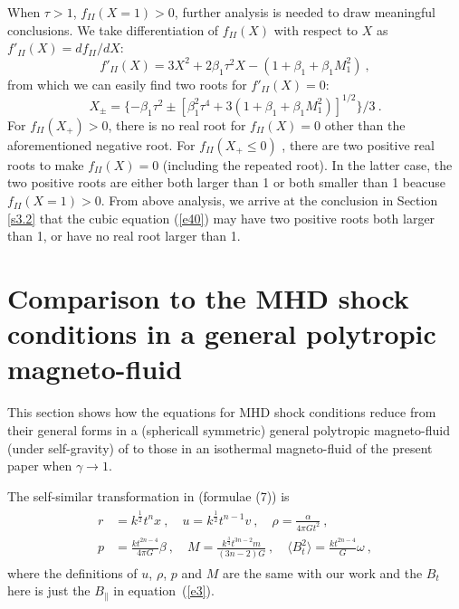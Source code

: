 \documentclass[fleqn,usenatbib]{mnras}
\begin{document}
When $\tau>1$, $f_{II}(X=1)>0$, further analysis is needed to draw meaningful conclusions. We take differentiation of $f_{II}(X)$ with respect to $X$ as $f'_{II}(X)=df_{II}/dX$:
\begin{equation}
f'_{II}(X)=3X^{2}+2\beta_{1}\tau^{2}X-\left(1+\beta_{1}+\beta_{1}M_{1}^{2}\right)\ ,
\end{equation}
from which we can easily find two roots for $f'_{II}(X)=0$:
\begin{equation}
X_{\pm}=\{ -\beta_{1}\tau^{2}\pm \left[ \beta_{1}^{2}\tau^{4}+3\left(1+\beta_{1}+\beta_{1}M_{1}^{2}\right)\right]^{1/2}\}/3\ .
\end{equation}
For $f_{II}(X_{+})>0$, there is no real root for $f_{II}(X)=0$ other than the aforementioned negative root. For $f_{II}(X_{+}\leq 0)$ 
, there are two positive real roots to make $f_{II}(X)=0$ (including the repeated root). In the latter case, the two positive roots are either both larger than 1 or both smaller than 1 beacuse $f_{II}(X=1)>0$. From above analysis, we arrive at the conclusion in Section \ref{s3.2} that the cubic equation (\ref{e40}) may have two positive roots both larger than 1, or have no real root larger than 1.


\section{Comparison to the MHD shock conditions in a general polytropic magneto-fluid}
\label{a5}
This section shows how the equations for MHD shock conditions reduce from their general forms in a (sphericall symmetric) general polytropic magneto-fluid (under self-gravity) of \citet{wang2008dynamic} to those in an isothermal magneto-fluid of the present paper when $\gamma\rightarrow 1$.

The self-similar transformation in \citet{wang2008dynamic} (formulae (7)) is
\begin{gather}
\begin{split}
r&=k^{\frac{1}{2}}t^{n}x\ ,\quad u=k^{\frac{1}{2}}t^{n-1}v\ ,\quad \rho=\frac{\alpha}{4\pi Gt^{2}}\ ,\\
p&=\frac{kt^{2n-4}}{4\pi G}\beta\ ,\quad M=\frac{k^{\frac{3}{4}}t^{3n-2}m}{(3n-2)G}\ ,\quad \langle B^{2}_{t}\rangle=\frac{kt^{2n-4}}{G}\omega\ ,
\end{split}\label{ee1}
\end{gather}
where the definitions of $u$, $\rho$, $p$ and $M$ are
the same with our work and the $B_{t}$ here is just the $B_{\parallel}$ in equation~(\ref{e3}). 
\end{document}
